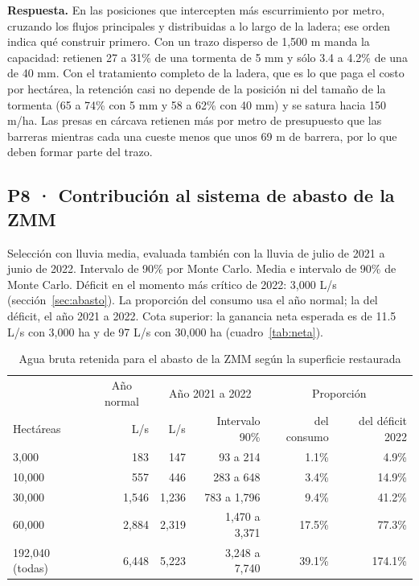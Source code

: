 \documentclass[11pt,letterpaper]{article}
\newcommand{\respuesta}[1]{\begin{cajarespuesta}\textbf{\color{naranja}Respuesta.} #1\end{cajarespuesta}}
\begin{document}
\respuesta{En las posiciones que intercepten más escurrimiento por metro, cruzando los flujos principales y distribuidas a lo largo de la ladera; ese orden indica qué construir primero. Con un trazo disperso de 1,500 m manda la capacidad: retienen 27 a 31\% de una tormenta de 5 mm y sólo 3.4 a 4.2\% de una de 40 mm. Con el tratamiento completo de la ladera, que es lo que paga el costo por hectárea, la retención casi no depende de la posición ni del tamaño de la tormenta (65 a 74\% con 5 mm y 58 a 62\% con 40 mm) y se satura hacia 150 m/ha. Las presas en cárcava retienen más por metro de presupuesto que las barreras mientras cada una cueste menos que unos 69 m de barrera, por lo que deben formar parte del trazo.}

\subsection{P8 · Contribución al sistema de abasto de la ZMM}\label{res:p8}

\begin{table}[H]\centering\small
\caption{Agua bruta retenida para el abasto de la ZMM según la superficie restaurada}\label{tab:abasto}
{\color{gris}Selección con lluvia media, evaluada también con la lluvia de julio de 2021 a junio de 2022. Intervalo de 90\% por Monte Carlo. Media e intervalo de 90\% de Monte Carlo. Déficit en el momento más crítico de 2022: 3,000 L/s (sección~\ref{sec:abasto}). La proporción del consumo usa el año normal; la del déficit, el año 2021 a 2022. Cota superior: la ganancia neta esperada es de 11.5 L/s con 3,000 ha y de 97 L/s con 30,000 ha (cuadro~\ref{tab:neta}).\par}\smallskip
\begin{tabularx}{\linewidth}{Xrrrrr}
\toprule
 & \multicolumn{1}{c}{Año normal} & \multicolumn{2}{c}{Año 2021 a 2022} & \multicolumn{2}{c}{Proporción} \\
Hectáreas & L/s & L/s & Intervalo 90\% & del consumo & del déficit 2022 \\
\midrule
3,000 & 183 & 147 & 93 a 214 & 1.1\% & 4.9\% \\
10,000 & 557 & 446 & 283 a 648 & 3.4\% & 14.9\% \\
30,000 & 1,546 & 1,236 & 783 a 1,796 & 9.4\% & 41.2\% \\
60,000 & 2,884 & 2,319 & 1,470 a 3,371 & 17.5\% & 77.3\% \\
192,040 (todas) & 6,448 & 5,223 & 3,248 a 7,740 & 39.1\% & 174.1\% \\
\bottomrule
\end{tabularx}
\end{table}
\end{document}
